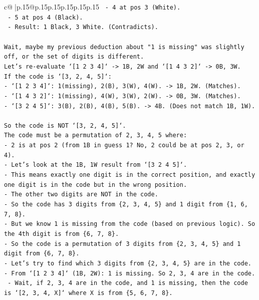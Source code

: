 \documentclass{article}
\begin{document}
{\begin{supertabular}{c@{$\;$}|p{.15\linewidth}@{}p{.15\linewidth}p{.15\linewidth}p{.15\linewidth}p{.15\linewidth}p{.15\linewidth}}
{{{\texttt{  {-} 4 at pos 3 (White).} \\
\texttt{  {-} 5 at pos 4 (Black).} \\
\texttt{  {-} Result: 1 Black, 3 White. (Contradicts).} \\
\\ 
\texttt{Wait, maybe my previous deduction about "1 is missing" was slightly off, or the set of digits is different.} \\
\texttt{Let's re{-}evaluate `{[}1 2 3 4{]}` {-}> 1B, 2W and `{[}1 4 3 2{]}` {-}> 0B, 3W.} \\
\texttt{If the code is `{[}3, 2, 4, 5{]}`:} \\
\texttt{{-} `{[}1 2 3 4{]}`: 1(missing), 2(B), 3(W), 4(W). {-}> 1B, 2W. (Matches).} \\
\texttt{{-} `{[}1 4 3 2{]}`: 1(missing), 4(W), 3(W), 2(W). {-}> 0B, 3W. (Matches).} \\
\texttt{{-} `{[}3 2 4 5{]}`: 3(B), 2(B), 4(B), 5(B). {-}> 4B. (Does not match 1B, 1W).} \\
\\ 
\texttt{So the code is NOT `{[}3, 2, 4, 5{]}`.} \\
\texttt{The code must be a permutation of 2, 3, 4, 5 where:} \\
\texttt{{-} 2 is at pos 2 (from 1B in guess 1? No, 2 could be at pos 2, 3, or 4).} \\
\texttt{{-} Let's look at the 1B, 1W result from `{[}3 2 4 5{]}`.} \\
\texttt{{-} This means exactly one digit is in the correct position, and exactly one digit is in the code but in the wrong position.} \\
\texttt{{-} The other two digits are NOT in the code.} \\
\texttt{{-} So the code has 3 digits from \{2, 3, 4, 5\} and 1 digit from \{1, 6, 7, 8\}.} \\
\texttt{{-} But we know 1 is missing from the code (based on previous logic). So the 4th digit is from \{6, 7, 8\}.} \\
\texttt{{-} So the code is a permutation of 3 digits from \{2, 3, 4, 5\} and 1 digit from \{6, 7, 8\}.} \\
\texttt{{-} Let's try to find which 3 digits from \{2, 3, 4, 5\} are in the code.} \\
\texttt{{-} From `{[}1 2 3 4{]}` (1B, 2W): 1 is missing. So 2, 3, 4 are in the code.} \\
\texttt{  {-} Wait, if 2, 3, 4 are in the code, and 1 is missing, then the code is `{[}2, 3, 4, X{]}` where X is from \{5, 6, 7, 8\}.} \\
}}}
\end{supertabular}}
\end{document}
